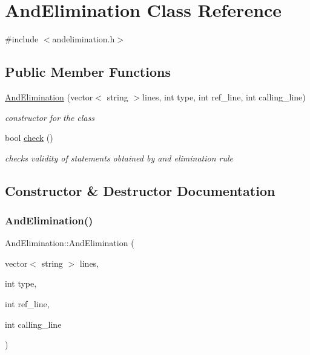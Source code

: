 \hypertarget{class_and_elimination}{}\section{And\+Elimination Class Reference}
\label{class_and_elimination}


{\ttfamily \#include $<$andelimination.\+h$>$}

\subsection*{Public Member Functions}
\begin{DoxyCompactItemize}
\item 
\mbox{\hyperlink{class_and_elimination_a375df55dd5c9ede927a62f54213dd0b7}{And\+Elimination}} (vector$<$ string $>$lines, int type, int ref\+\_\+line, int calling\+\_\+line)
\begin{DoxyCompactList}\small\item\em constructor for the class \end{DoxyCompactList}\item 
bool \mbox{\hyperlink{class_and_elimination_a851f0f5c687ae7d611d3954afaebd7a6}{check}} ()
\begin{DoxyCompactList}\small\item\em checks validity of statements obtained by and elimination rule \end{DoxyCompactList}\end{DoxyCompactItemize}


\subsection{Constructor \& Destructor Documentation}
\mbox{\label{class_and_elimination_a375df55dd5c9ede927a62f54213dd0b7}} 
\subsubsection{\texorpdfstring{And\+Elimination()}{AndElimination()}}
{\footnotesize\ttfamily And\+Elimination\+::\+And\+Elimination (\begin{DoxyParamCaption}\item[{vector$<$ string $>$}]{lines,  }\item[{int}]{type,  }\item[{int}]{ref\+\_\+line,  }\item[{int}]{calling\+\_\+line }\end{DoxyParamCaption})\hspace{0.3cm}{\ttfamily [inline]}}



